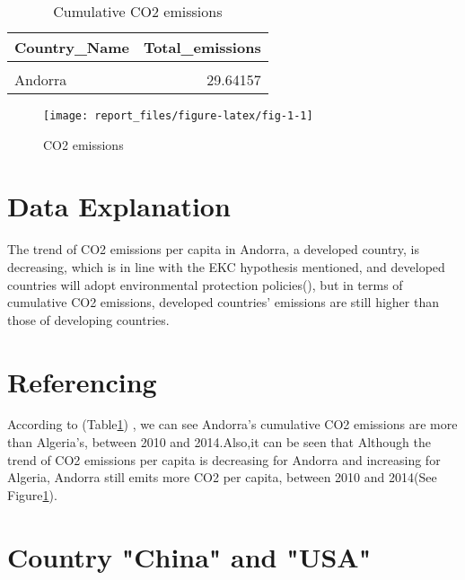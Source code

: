 \documentclass[11pt,a4paper,]{article}
\begin{document}
\begin{table}[!h]

\caption{\label{tab:table-1}Cumulative CO2 emissions}
\centering
\begin{tabular}[t]{lr}
\toprule
Country\_Name & Total\_emissions\\
\midrule
\cellcolor{gray!6}{Algeria} & \cellcolor{gray!6}{17.35632}\\
Andorra & 29.64157\\
\bottomrule
\end{tabular}
\end{table}

\begin{figure}[H]

{\centering \texttt{[image: report\_files/figure-latex/fig-1-1]} 

}

\caption{CO2 emissions}\label{fig:fig-1}
\end{figure}

\hypertarget{data-explanation-1}{%
\section{Data Explanation}\label{data-explanation-1}}

The trend of CO2 emissions per capita in Andorra, a developed country, is decreasing, which is in line with the EKC hypothesis mentioned, and developed countries will adopt environmental protection policies(\textcite{RE1}), but in terms of cumulative CO2 emissions, developed countries' emissions are still higher than those of developing countries.

\hypertarget{referencing-1}{%
\section{Referencing}\label{referencing-1}}

According to (Table\ref{tab:table-1}) , we can see Andorra's cumulative CO2 emissions are more than Algeria's, between 2010 and 2014.Also,it can be seen that Although the trend of CO2 emissions per capita is decreasing for Andorra and increasing for Algeria, Andorra still emits more CO2 per capita, between 2010 and 2014(See Figure\ref{fig:fig-1}).

\section*{Country "China" and "USA"}
\end{document}
